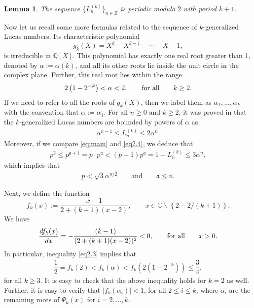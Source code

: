 \documentclass[11pt,a4paper]{article}
\newtheorem{lemma}[theorem]{Lemma}
\numberwithin{equation}{section}
\numberwithin{table}{section}
\numberwithin{figure}{section}
\begin{document}
\begin{lemma}
\label{lem:1}
The sequence $\{L_n^{(k)}\}_{n\in {\mathbb Z}}$ is periodic modulo $2$ with period $k+1$.
\end{lemma} 

Now let us recall some more formulas related to the sequence of $k$-generalized Lucas numbers. Its characteristic  polynomial
$$
g_k(X) = X^k - X^{k-1} - \cdots - X - 1,
$$
is irreducible in $\mathbb{Q}[X]$. This polynomial has exactly one real root greater than 1, denoted by $\alpha := \alpha(k)$, and all its other roots lie inside the unit circle in the complex plane. Further, this real root lies within the range
\begin{align}\label{eq2.3}
	2\left(1 - 2^{-k} \right) < \alpha < 2,\qquad {\text{\rm for~all}}\qquad k\ge 2.
\end{align}
If we need to refer to all the roots of $g_k(X)$, then we label them as $\alpha_1,\ldots,\alpha_k$ with the convention that $\alpha:=\alpha_1$. For all $n \geq 0$ and $k \geq 2$, it was proved in \cite{BRL} that the $k$-generalized Lucas numbers are bounded by powers of $\alpha$ as
\begin{align}\label{eq2.4}
	\alpha^{n-1} \leq L_n^{(k)} \leq 2\alpha^n.
\end{align}
Moreover, if we compare \eqref{eq:main} and \eqref{eq2.4}, we deduce that
\begin{align*}
	p^2 \le p^{\mathfrak{a}+1}=p\cdot  p^\mathfrak{a}<(p+1)p^\mathfrak{a}=1+ L_n^{(k)} \leq 3\alpha^n,
\end{align*}
which implies that
\begin{align}\label{a-bound}
	p < \sqrt3 \alpha^{n/2} \qquad \text{and}\qquad \mathfrak{a} \le n.
\end{align}

Next, we define the function
\begin{equation*}
	f_k(x) := \frac{x - 1}{2 + (k + 1)(x - 2)},\qquad x\in {\mathbb C}\backslash \left\{2-{2}/{(k+1)}\right\}.
\end{equation*}
We have 
$$
\frac{df_k(x)}{dx}=-\frac{(k-1)}{(2+(k+1)(x-2))^2}<0,\qquad {\text{\rm for all}}\qquad x>0.
$$
In particular, inequality \eqref{eq2.3} implies that
\begin{align}\label{eq2.5}
	\dfrac{1}{2}=f_k(2)<f_k(\alpha)<f_k(2(1 - 2^{-k} ))\le \dfrac{3}{4},
\end{align}
for all $k\ge 3$. It is easy to check that the above inequality holds for $k=2$ as well. Further, it is easy to verify that $|f_k(\alpha_i)|<1$, for all $2\le i\le k$, where $\alpha_i$ are the remaining 
roots of $\Psi_k(x)$ for $i=2,\ldots,k$.
\end{document}
